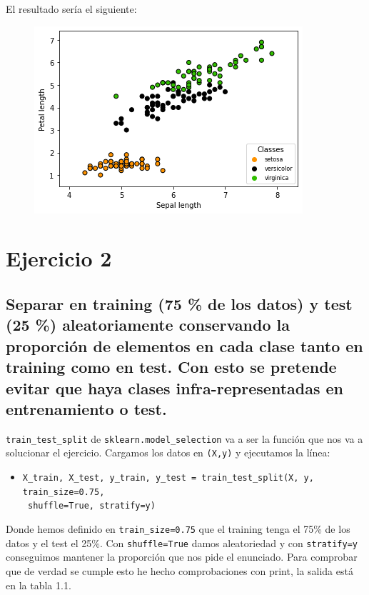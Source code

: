 \documentclass[11pt,a4paper]{report}
\newcommand\tab[1][1cm]{\hspace*{#1}}
\begin{document}
El resultado sería el siguiente:
\begin{figure}[htp]
\centering
\includegraphics[scale=1.00]{imagenes/Ejercicio1.png}
\caption{}
\label{t2}
\end{figure}




\section*{Ejercicio 2}
\subsection*{Separar en training (75 \% de los datos) y test (25 \%) aleatoriamente conservando la proporción de elementos en cada clase tanto en training como en test. Con esto se pretende evitar que haya clases
infra-representadas en entrenamiento o test.}
\texttt{train\_test\_split} de \texttt{sklearn.model\_selection} va a ser la función que nos va a solucionar el ejercicio. Cargamos los datos en \texttt{(X,y)} y ejecutamos la línea:

\begin{itemize}
\item \texttt{X\_train, X\_test, y\_train, y\_test = train\_test\_split(X, y, train\_size=0.75,}\\ \tab\tab\tab\tab\tab\tab\tab\tab\tab\tab \texttt{ shuffle=True, stratify=y)}
\end{itemize}

Donde hemos definido en \texttt{train\_size=0.75} que el training tenga el 75\% de los datos y el test el 25\%. Con \texttt{shuffle=True} damos aleatoriedad y con \texttt{stratify=y} conseguimos mantener la proporción que nos pide el enunciado. Para comprobar que de verdad se cumple esto he hecho comprobaciones con print, la salida está en la tabla 1.1.
\end{document}
